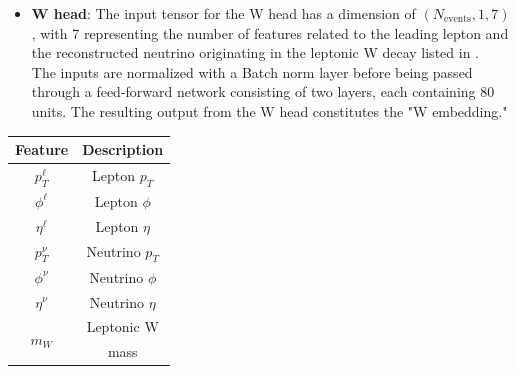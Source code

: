 \begin{minipage}{0.625\linewidth}
\begin{itemize}
    \item \textbf{W head}: The input tensor for the W head has a dimension of $(N_{\text{events}},1,7)$, with 7 representing the number of features related to the leading lepton and the reconstructed neutrino originating in the leptonic W decay listed in .\\
    The inputs are normalized with a Batch norm layer before being passed through a feed-forward network consisting of two layers, each containing 80 units.
    The resulting output from the W head constitutes the "W embedding."
\end{itemize}
\end{minipage}
    \hfill
\begin{minipage}{0.33\linewidth}
        \centering
        \fontsize{11pt}{11pt}\selectfont
        \begin{tabular}{c|c}
            \toprule
             \textbf{Feature}& \textbf{Description} \\
             \midrule
             
             $p_T^\ell$& Lepton $p_T$ \\
             $\phi^\ell$& Lepton $\phi$ \\
             $\eta^\ell$& Lepton $\eta$ \\
             \midrule
             $ p_T^\nu$& Neutrino $p_T$ \\
             $\phi^\nu$& Neutrino $\phi$ \\
             $\eta^\nu$& Neutrino $\eta$ \\
             \midrule
             \multirow{2}{*}{$m_W$} &Leptonic W\\
             &mass\\
             \bottomrule
        \end{tabular}
        \label{tab:Whead}
\end{minipage}
\\
